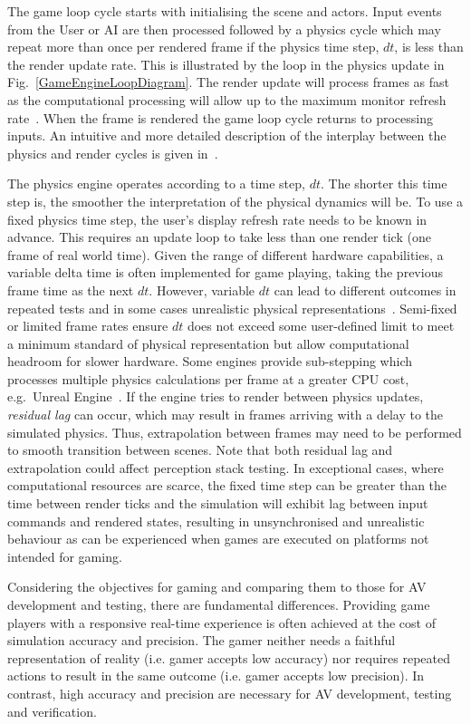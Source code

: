 The game loop cycle starts with initialising the scene and actors. Input events from the User or AI are then processed followed by a physics cycle which may repeat more than once per rendered frame if the physics time step, $dt$, is less than the render update rate. This is illustrated by the loop in the physics update in Fig.~\ref{GameEngineLoopDiagram}. The render update will process frames as fast as the computational processing will allow up to the maximum monitor refresh rate~\cite{unity_framerates}. When the frame is rendered the game loop cycle returns to processing inputs. An intuitive and  more detailed description of the interplay between the physics and render cycles is given in~\cite{JohnAustinUnity}.

The physics engine operates according to a time step, $dt$. The shorter this time step is, the smoother the interpretation of the physical dynamics will be. To use a fixed physics time step, the user's display refresh rate needs to be known in advance. This requires an update loop to take less than one render tick (one frame of real world time). Given the range of different hardware capabilities, a variable delta time is often implemented for game playing, taking the previous frame time as the next $dt$. However, variable $dt$ can lead to different outcomes in repeated tests and in some cases unrealistic physical representations~\cite{gaffer}. 
%
Semi-fixed or limited frame rates ensure $dt$ does not exceed some user-defined limit to meet a minimum standard of physical representation but allow computational headroom for slower hardware. Some engines provide sub-stepping which processes multiple physics calculations per frame at a greater CPU cost, e.g.\ Unreal Engine~\cite{UE4_substepping}. If the engine tries to render between physics updates, \textit{residual lag} can occur, which may result in frames arriving with a delay to the simulated physics. Thus, extrapolation between frames may need to be performed to smooth transition between scenes. Note that both residual lag and extrapolation could affect perception stack testing. In exceptional cases, where computational resources are scarce, the fixed time step can be greater than the time between render ticks and the simulation will exhibit lag between input commands and rendered states, resulting in unsynchronised and unrealistic behaviour as can be experienced when games are executed on platforms not intended for gaming. 

Considering the objectives for gaming and comparing them to those for AV development and testing, there are fundamental differences. Providing game players with a responsive real-time experience is often achieved at the cost of simulation accuracy and precision.
% 
The gamer neither needs a faithful representation of reality (i.e. gamer accepts low accuracy) nor requires repeated actions to result in the same outcome (i.e. gamer accepts low precision). In contrast, high accuracy and precision are necessary for AV development, testing and verification.

